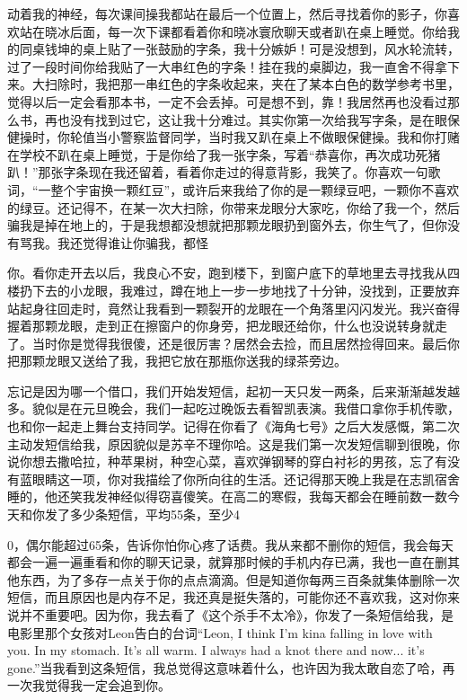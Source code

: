 \documentclass{article}
\begin{document}
\newpage 

动着我的神经，每次课间操我都站在最后一个位置上，然后寻找着你的影子，你喜欢站在晓冰后面，每一次下课都看着你和晓冰寰欣聊天或者趴在桌上睡觉。你给我的同桌钱坤的桌上贴了一张鼓励的字条，我十分嫉妒！可是没想到，风水轮流转，过了一段时间你给我贴了一大串红色的字条！挂在我的桌脚边，我一直舍不得拿下来。大扫除时，我把那一串红色的字条收起来，夹在了某本白色的数学参考书里，觉得以后一定会看那本书，一定不会丢掉。可是想不到，靠！我居然再也没看过那么书，再也没有找到过它，这让我十分难过。其实你第一次给我写字条，是在眼保健操时，你轮值当小警察监督同学，当时我又趴在桌上不做眼保健操。我和你打赌在学校不趴在桌上睡觉，于是你给了我一张字条，写着“恭喜你，再次成功死猪趴！”那张字条现在我还留着，看着你走过的得意背影，我笑了。你喜欢一句歌词，“一整个宇宙换一颗红豆”，或许后来我给了你的是一颗绿豆吧，一颗你不喜欢的绿豆。还记得不，在某一次大扫除，你带来龙眼分大家吃，你给了我一个，然后骗我是掉在地上的，于是我想都没想就把那颗龙眼扔到窗外去，你生气了，但你没有骂我。我还觉得谁让你骗我，都怪

\newpage 

你。看你走开去以后，我良心不安，跑到楼下，到窗户底下的草地里去寻找我从四楼扔下去的小龙眼，我难过，蹲在地上一步一步地找了十分钟，没找到，正要放弃站起身往回走时，竟然让我看到一颗裂开的龙眼在一个角落里闪闪发光。我兴奋得握着那颗龙眼，走到正在擦窗户的你身旁，把龙眼还给你，什么也没说转身就走了。当时你是觉得我很傻，还是很厉害？居然会去捡，而且居然捡得回来。最后你把那颗龙眼又送给了我，我把它放在那瓶你送我的绿茶旁边。

忘记是因为哪一个借口，我们开始发短信，起初一天只发一两条，后来渐渐越发越多。貌似是在元旦晚会，我们一起吃过晚饭去看智凯表演。我借口拿你手机传歌，也和你一起走上舞台支持同学。记得在你看了《海角七号》之后大发感慨，第二次主动发短信给我，原因貌似是苏辛不理你哈。这是我们第一次发短信聊到很晚，你说你想去撒哈拉，种苹果树，种空心菜，喜欢弹钢琴的穿白衬衫的男孩，忘了有没有蓝眼睛这一项，你对我描绘了你所向往的生活。还记得那天晚上我是在志凯宿舍睡的，他还笑我发神经似得窃喜傻笑。在高二的寒假，我每天都会在睡前数一数今天和你发了多少条短信，平均55条，至少4

\newpage 

0，偶尔能超过65条，告诉你怕你心疼了话费。我从来都不删你的短信，我会每天都会一遍一遍重看和你的聊天记录，就算那时候的手机内存已满，我也一直在删其他东西，为了多存一点关于你的点点滴滴。但是知道你每两三百条就集体删除一次短信，而且原因也是内存不足，我还真是挺失落的，可能你还不喜欢我，这对你来说并不重要吧。因为你，我去看了《这个杀手不太冷》，你发了一条短信给我，是电影里那个女孩对Leon告白的台词“Leon, I think I'm kina falling in love with you. In my stomach. It's all warm. I always had a knot there and now... it's gone.”当我看到这条短信，我总觉得这意味着什么，也许因为我太敢自恋了哈，再一次我觉得我一定会追到你。
\end{document}
